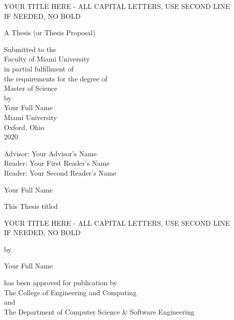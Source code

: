 \documentclass[12pt, oneside]{book2}
\newcommand{\documentTitle}{YOUR TITLE HERE - ALL CAPITAL LETTERS, USE SECOND LINE \\IF NEEDED, NO BOLD}
\newcommand{\documentType}{Thesis (or Thesis Proposal)}
\newcommand{\documentAuthor}{Your Full Name}
\newcommand{\documentYear}{2020}
\newcommand{\thesisAdvisor}{Your Advisor's Name}
\newcommand{\thesisFirstReader}{Your First Reader's Name}
\newcommand{\thesisSecondReader}{Your Second Reader's Name}
\begin{document}
\begin{titlepage}
\begin{center}

    \documentTitle

    \vspace{1.5cm}

    A \documentType \\

    \vspace{0.5cm}

    Submitted to the \\
    Faculty of Miami University \\
    in partial fulfillment of \\
    the requirements for the degree of \\
    Master of Science \\
    by \\
    \documentAuthor \\
    Miami University \\
    Oxford, Ohio \\
    \documentYear

    \vspace{1.5cm}

    Advisor: \thesisAdvisor\\
    Reader: \thesisFirstReader\\
    Reader: \thesisSecondReader\\

    \vspace{1.5cm}

    \textcopyright \documentYear \documentAuthor

    \newpage

    This Thesis titled

    \vspace{1.0cm}

    \documentTitle

    \vspace{1.0cm}

    by

    \vspace{1.0cm}

    \documentAuthor

    \vspace{1.0cm}

    has been approved for publication by\\
    \vspace{0.75cm}
    The College of Engineering and Computing\\
    \vspace{0.5cm}
    and\\
    \vspace{0.5cm}
    The Department of Computer Science \& Software Engineering\\


\end{center}
\end{titlepage}
\end{document}
